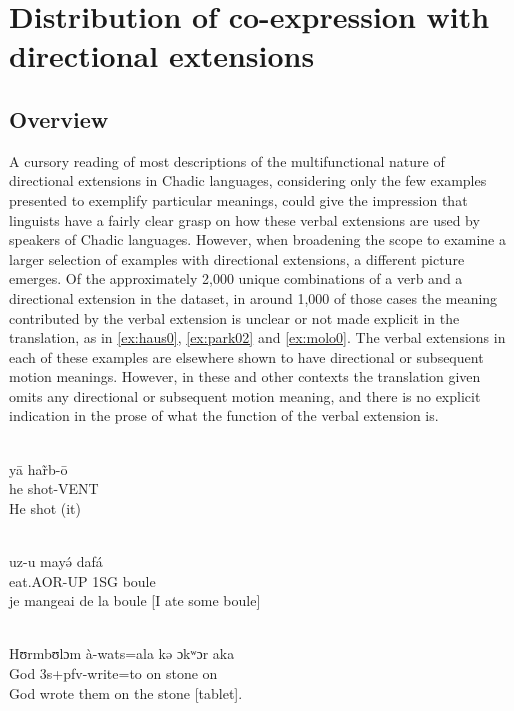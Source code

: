 \chapter{Distribution of co-expression with directional extensions} \label{ch:functions2}

\section{Overview}

A cursory reading of most descriptions of the multifunctional nature of directional extensions in Chadic languages, considering only the few examples presented to exemplify particular meanings, could give the impression that linguists have a fairly clear grasp on how these verbal extensions are used by speakers of Chadic languages. However, when broadening the scope to examine a larger selection of examples with directional extensions, a different picture emerges. Of the approximately 2,000 unique combinations of a verb and a directional extension in the dataset, in around 1,000 of those cases the meaning contributed by the verbal extension is unclear or not made explicit in the translation, as in \ref{ex:haus0}, \ref{ex:park02} and \ref{ex:molo0}. The verbal extensions in each of these examples are elsewhere shown to have directional or subsequent motion meanings. However, in these and other contexts the translation given omits any directional or subsequent motion meaning, and there is no explicit indication in the prose of what the function of the verbal extension is.

\ea\label{ex:haus0}
 \\
\gll  yā har̃b-ō	\\
he shot-VENT		\\
\glt He shot (it)	

\ex \label{ex:park02}
 \\
\gll uz-u mayə́ dafá	\\
eat.AOR-UP 1SG boule	\\
\glt je mangeai de la boule	[I ate some boule] 	

\ex \label{ex:molo0}
 \\
\gll Hʊrmbʊlɔm à-wats=ala kə ɔkʷɔr aka	\\
God 3s+pfv-write=to on stone on	\\
\glt God wrote them on the stone [tablet].
\z 

